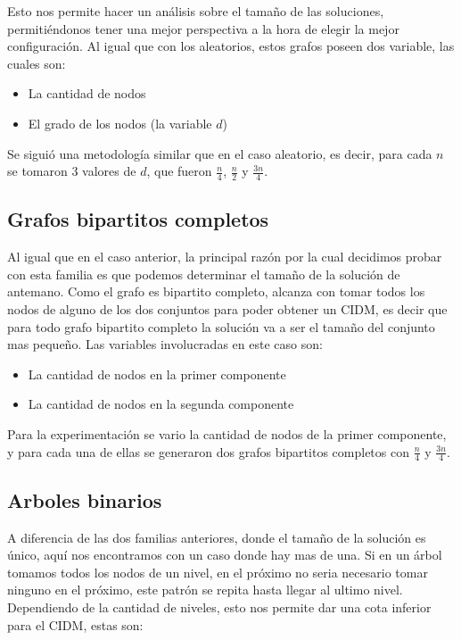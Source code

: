 Esto nos permite hacer un análisis sobre el tamaño de las soluciones, permitiéndonos tener una mejor perspectiva a la hora de elegir la mejor configuración. Al igual que con los aleatorios, estos grafos poseen dos variable, las cuales son:

\begin{itemize}
	\item La cantidad de nodos
	\item El grado de los nodos (la variable $d$)
\end{itemize}
	
Se siguió una metodología similar que en el caso aleatorio, es decir, para cada $n$ se tomaron 3 valores de $d$, que fueron $\frac{n}{4}$, $\frac{n}{2}$ y $\frac{3n}{4}$.

\subsection{Grafos bipartitos completos}

Al igual que en el caso anterior, la principal razón por la cual decidimos probar con esta familia es que podemos determinar el tamaño de la solución de antemano. Como el grafo es bipartito completo, alcanza con tomar todos los nodos de alguno de los dos conjuntos para poder obtener un CIDM, es decir que para todo grafo bipartito completo la solución va a ser el tamaño del conjunto mas pequeño. Las variables involucradas en este caso son:

\begin{itemize}
	\item La cantidad de nodos en la primer componente
	\item La cantidad de nodos en la segunda componente
\end{itemize}

Para la experimentación se vario la cantidad de nodos de la primer componente, y para cada una de ellas se generaron dos grafos bipartitos completos con $\frac{n}{4}$ y $\frac{3n}{4}$.

\subsection{Arboles binarios}

A diferencia de las dos familias anteriores, donde el tamaño de la solución es único, aquí nos encontramos con un caso donde hay mas de una. Si en un árbol tomamos todos los nodos de un nivel, en el próximo no seria necesario tomar ninguno en el próximo, este patrón se repita hasta llegar al ultimo nivel. Dependiendo de la cantidad de niveles, esto nos permite dar una cota inferior para el CIDM, estas son:

